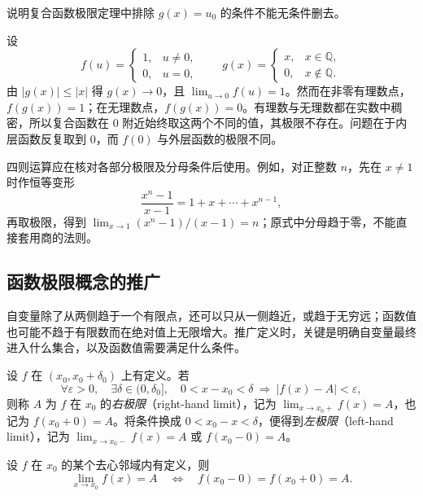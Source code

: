 \begin{example}
\label{ex:composition-limit-exception}
说明复合函数极限定理中排除 $g(x)=u_0$ 的条件不能无条件删去。
\end{example}

\begin{solve}
设
\[
    f(u)=\begin{cases}1,&u\neq0,\\0,&u=0,\end{cases}
    \qquad
    g(x)=\begin{cases}x,&x\in\mathbb{Q},\\0,&x\notin\mathbb{Q}.\end{cases}
\]
由 $|g(x)|\leq|x|$ 得 $g(x)\to0$，且 $\lim_{u\to0}f(u)=1$。然而在非零有理数点，$f(g(x))=1$；在无理数点，$f(g(x))=0$。有理数与无理数都在实数中稠密，所以复合函数在 $0$ 附近始终取这两个不同的值，其极限不存在。问题在于内层函数反复取到 $0$，而 $f(0)$ 与外层函数的极限不同。
\end{solve}

四则运算应在核对各部分极限及分母条件后使用。例如，对正整数 $n$，先在 $x\neq1$ 时作恒等变形
\[
    \frac{x^n-1}{x-1}=1+x+\cdots+x^{n-1},
\]
再取极限，得到 $\lim_{x\to1}(x^n-1)/(x-1)=n$；原式中分母趋于零，不能直接套用商的法则。

\subsection{函数极限概念的推广}
\label{subsec:generalizations-of-function-limits}

自变量除了从两侧趋于一个有限点，还可以只从一侧趋近，或趋于无穷远；函数值也可能不趋于有限数而在绝对值上无限增大。推广定义时，关键是明确自变量最终进入什么集合，以及函数值需要满足什么条件。

\begin{definition}
\label{def:one-sided-function-limits}
设 $f$ 在 $(x_0,x_0+\delta_0)$ 上有定义。若
\[
    \forall\varepsilon>0,\quad\exists\delta\in(0,\delta_0],\quad
    0<x-x_0<\delta\ \Longrightarrow\ |f(x)-A|<\varepsilon,
\]
则称 $A$ 为 $f$ 在 $x_0$ 的\emph{右极限}（right-hand limit），记为 $\lim_{x\to x_0+}f(x)=A$，也记为 $f(x_0+0)=A$。将条件换成 $0<x_0-x<\delta$，便得到\emph{左极限}（left-hand limit），记为 $\lim_{x\to x_0-}f(x)=A$ 或 $f(x_0-0)=A$。
\end{definition}

\begin{proposition}[双侧极限与单侧极限]
\label{prop:two-sided-and-one-sided-limits}
设 $f$ 在 $x_0$ 的某个去心邻域内有定义，则
\[
    \lim_{x\to x_0}f(x)=A
    \quad\Longleftrightarrow\quad
    f(x_0-0)=f(x_0+0)=A.
\]
\end{proposition}

